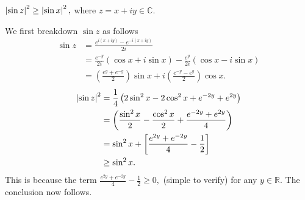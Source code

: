 \documentclass[12pt]{book}
\begin{document}
\begin{exmp}
    $\left\lvert \sin z \right\rvert^{2} \geq \left\lvert \sin x \right\rvert^{2},$ where $z = x + iy \in \mathbb{C}.$
\end{exmp}
We first breakdown $\sin z$ as follows
\begin{align*}
    \sin z
        &=
            \frac{e^{i(x + iy)} - e^{-i(x + iy)}}{2i} \\
        &=
            \frac{e^{-y}}{2i}(\cos x + i \sin x) - \frac{e^{y}}{2i}(\cos x - i \sin x) \\
        &=
            \left(\frac{e^{y} + e^{-y}}{2}\right)\sin x + i \left(\frac{e^{-y} - e^{y}}{2}\right)\cos x.
\end{align*}
\begin{align*}
    \left\lvert \sin z \right\rvert^{2}
        &=
            \frac{1}{4}\left(2 \sin^{2}x - 2\cos^{2}x + e^{-2y} + e^{2y}\right) \\
        &=
            \left(\frac{\sin^{2}x}{2} - \frac{\cos^{2}x}{2} + \frac{e^{-2y} + e^{2y}}{4}\right) \\
        &=
            \sin^{2}x + \left[\frac{e^{2y} + e^{-2y}}{4} - \frac{1}{2}\right] \\
        &\geq
            \sin^{2}x.
\end{align*}
This is because the term $\frac{e^{2y} + e^{-2y}}{4} - \frac{1}{2} \geq 0,$ (simple to verify) for any $y \in \mathbb{R}.$ The conclusion now follows.
\end{document}
